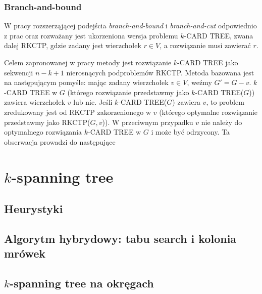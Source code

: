 \documentclass[12pt]{article}
\begin{document}
\subsubsection{Branch-and-bound}

W pracy \cite{branch_and_bound} rozszerząjącej podejścia \textit{branch-and-bound} i \textit{branch-and-cut} odpowiednio z prac \cite{integer} oraz \cite{fast} rozważany jest ukorzeniona wersja problemu $k$-CARD TREE, zwana dalej RKCTP, gdzie zadany jest wierzchołek $r \in V$, a rozwiązanie musi zawierać $r$. 

Celem zapronowanej w pracy metody jest rozwiązanie $k$-CARD TREE jako sekwencji $n-k+1$ nierosnących podproblemów RKCTP. Metoda bazowana jest na następującym pomyśle: mając zadany wierzchołek $v \in V$, weźmy $G' = G - v$. $k$-CARD TREE w $G$ (którego rozwiązanie przedstawmy jako $k$-CARD TREE($G$)) zawiera wierzchołek $v$ lub nie. Jeśli $k$-CARD TREE($G$) zawiera $v$, to problem zredukowany jest od RKCTP zakorzenionego w $v$ (którego optymalne rozwiązanie przedstawmy jako RKCTP($G,v$)). W przeciwnym przypadku $v$ nie należy do optymalnego rozwiązania $k$-CARD TREE w $G$ i może być odrzycony. Ta obserwacja prowadzi do następujące


\section{$k$-spanning tree}

\subsection{Heurystyki}

\subsection{Algorytm hybrydowy: tabu search i kolonia mrówek}

\subsection{$k$-spanning tree na okręgach}

\newpage



\end{document}

